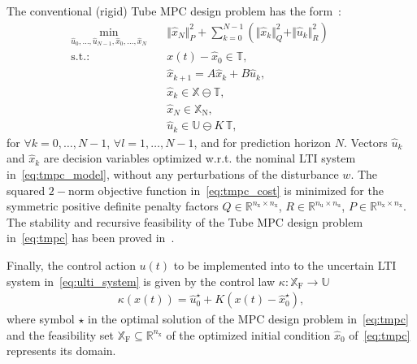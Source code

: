 \documentclass[letterpaper, 10 pt, conference]{ieeeconf}
\begin{document}
	
	The conventional (rigid) Tube MPC design problem has the form~\cite{MS05}:
	\begin{subequations}
		\label{eq:tmpc}
		\begin{eqnarray}
			\label{eq:tmpc_cost}
			\min_{\hat{u}_{0},\ldots,\hat{u}_{N-1}, \hat{x}_{0},\ldots,\hat{x}_{N} } \!\!\!\!\!\!\!\!\!\!\! &\,& \Vert \hat{x}_{N} \Vert_{P}^{2} + \sum_{k=0}^{N-1} \left( \Vert \hat{x}_{k} \Vert_{Q}^{2} + \Vert \hat{u}_{k} \Vert_{R}^{2} \right) \qquad \\
			\label{eq:tmpc_rpi}
			\mathrm{s.t.\!:} &\,& x(t) - \hat{x}_{0} \in \mathbb{T} , \\
			\label{eq:tmpc_model}
			&\,&  \hat{x}_{k+1} = A \hat{x}_{k} + B \hat{u}_{k} , \\
			\label{eq:tmpc_constraints_state}
			&\,& \hat{x}_{k} \in \mathbb{X} \ominus \mathbb{T} , \\
			\label{eq:tmpc_constraints_terminal}
			&\,& \hat{x}_{N} \in \mathbb{X}_{\mathrm{N}}, \\
			\label{eq:tmpc_constraints_input}
			&\,& \hat{u}_{k} \in \mathbb{U} \ominus K \, \mathbb{T} , 
		\end{eqnarray}
	\end{subequations}
	for $\forall k = 0, \dots, N-1$,  $\forall l = 1, \dots, N-1$, and for prediction horizon $N$. Vectors $\hat{u}_{k}$ and $\hat{x}_{k}$ are decision variables optimized w.r.t. the nominal LTI system in~\eqref{eq:tmpc_model}, without any perturbations of the disturbance $w$. 
	The squared $2-$norm objective function in~\eqref{eq:tmpc_cost} is minimized for the symmetric positive definite penalty factors $Q \in \mathbb{R}^{n_{\mathrm{x}} \times n_{\mathrm{x}}}$, $R \in \mathbb{R}^{n_{\mathrm{u}} \times n_{\mathrm{u}}}$, $P \in \mathbb{R}^{n_{\mathrm{x}} \times n_{\mathrm{x}}}$. 
	The stability and recursive feasibility of the Tube MPC design problem in~\eqref{eq:tmpc} has been proved in~\cite{MS05}.
	
	Finally, the control action $u(t)$ to be implemented into to the uncertain LTI system in~\eqref{eq:ulti_system} is given by the control law $\kappa : \mathbb{X}_{\mathrm{F}} \rightarrow \mathbb{U}$
	\begin{eqnarray}
		\label{eq:tmpc_control_law}
		\kappa(x(t)) = \hat{u}_{0}^{\star} + K \left( x(t) - \hat{x}_{0}^{\star} \right),
	\end{eqnarray}
	where symbol $\star$ in the optimal solution of the MPC design problem in~\eqref{eq:tmpc} and the feasibility set $\mathbb{X}_{\mathrm{F}} \subseteq \mathbb{R}^{n_{\mathrm{x}}}$ of the optimized initial condition $\hat{x}_{0}$ of~\eqref{eq:tmpc} represents its domain. 
	
\end{document}
